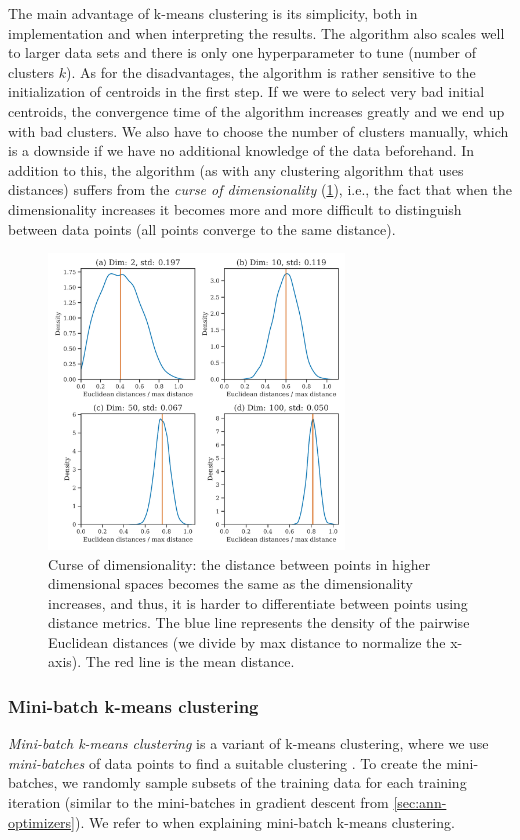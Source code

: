 The main advantage of k-means clustering is its simplicity, both in implementation and when interpreting the results. The algorithm also scales well to larger data sets and there is only one hyperparameter to tune (number of clusters $k$). As for the disadvantages, the algorithm is rather sensitive to the initialization of centroids in the first step. If we were to select very bad initial centroids, the convergence time of the algorithm increases greatly and we end up with bad clusters. We also have to choose the number of clusters manually, which is a downside if we have no additional knowledge of the data beforehand. In addition to this, the algorithm (as with any clustering algorithm that uses distances) suffers from the \textit{curse of dimensionality} (\cref{fig:curse-of-dimensionality}), i.e., the fact that when the dimensionality increases it becomes more and more difficult to distinguish between data points (all points converge to the same distance).
\begin{figure}[H]
    \centering
    \includegraphics[width=0.7\textwidth]{thesis/figures/curse-of-dimensionality.pdf}
    \caption{Curse of dimensionality: the distance between points in higher dimensional spaces becomes the same as the dimensionality increases, and thus, it is harder to differentiate between points using distance metrics. The blue line represents the density of the pairwise Euclidean distances (we divide by max distance to normalize the x-axis). The red line is the mean distance.}
    \label{fig:curse-of-dimensionality}
\end{figure}

\subsubsection{Mini-batch k-means clustering}
\label{sec:mini-batch-k-means-clustering}
\textit{Mini-batch k-means clustering} is a variant of k-means clustering, where we use \textit{mini-batches} of data points to find a suitable clustering \cite{sculley2010}. To create the mini-batches, we randomly sample subsets of the training data for each training iteration (similar to the mini-batches in gradient descent from \cref{sec:ann-optimizers}). We refer to \cite{sculley2010} when explaining mini-batch k-means clustering.

